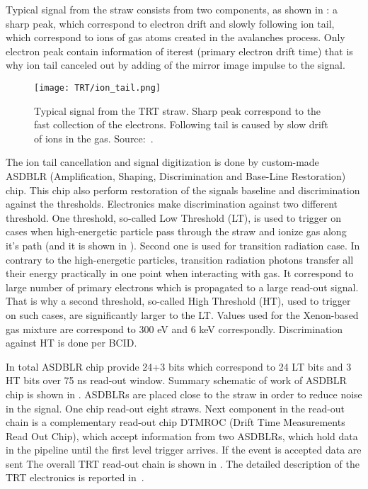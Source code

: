 Typical signal from the straw consists from two components, as shown in : 
a sharp peak, which correspond to electron drift and slowly following ion tail, which correspond to ions of gas atoms created in the avalanches process.
Only electron peak contain information of iterest (primary electron drift time) that is why ion tail canceled out by adding of the mirror image impulse to the signal.

\begin{figure}
\centering
\texttt{[image: TRT/ion\_tail.png]}
\caption{ 
 Typical signal from the TRT straw. Sharp peak correspond to the fast collection of the electrons. 
 Following tail is caused by slow drift of ions in the gas.
 Source:~\cite{ID_TDR_vol2}.
}
\label{fig:ion_tail}
\end{figure}

The ion tail cancellation and signal digitization is done by custom-made ASDBLR (Amplification, Shaping, Discrimination and Base-Line Restoration) chip. 
This chip also perform restoration of the signals baseline and discrimination against the thresholds. 
Electronics make discrimination against two different threshold. One threshold, so-called Low Threshold (LT), 
is used to trigger on cases when high-energetic particle pass through the straw and ionize gas along it's path (and it is shown in ).
Second one is used for transition radiation case.
In contrary to the high-energetic particles, transition radiation photons transfer all their energy practically in one point when interacting with gas.
It correspond to large number of primary electrons which is propagated to a large read-out signal.
That is why a second threshold, so-called High Threshold (HT), used to trigger on such cases, are significantly larger to the LT.
Values used for the Xenon-based gas mixture are correspond to 300 eV and 6 keV correspondly.
Discrimination against HT is done per BCID. 

In total ASDBLR chip provide 24+3 bits which correspond to 24 LT bits and 3 HT bits over 75 ns read-out window.
Summary schematic of work of ASDBLR chip is shown in .
ASDBLRs are placed close to the straw in order to reduce noise in the signal. One chip read-out eight straws.
Next component in the read-out chain is a complementary read-out chip DTMROC (Drift Time Measurements Read Out Chip), which accept 
information from two ASDBLRs, which hold data in the pipeline until the first level trigger arrives. If the event is accepted 
data are sent 
The overall TRT read-out chain is shown in . The detailed description of the TRT electronics is reported in~\cite{TRT_electronics}.

